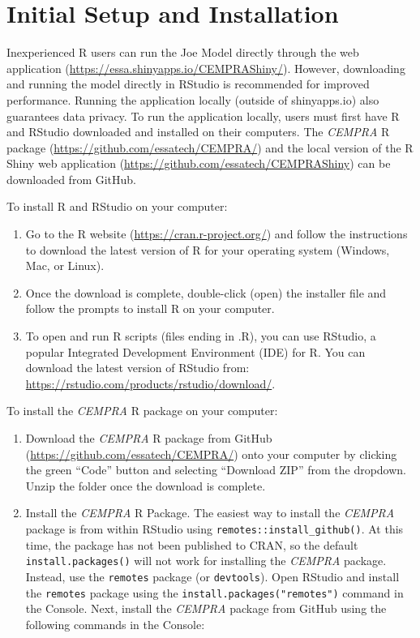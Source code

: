 \documentclass[
  letterpaper,
  DIV=11,
  numbers=noendperiod]{scrreprt}
\providecommand{\tightlist}{%
  \setlength{\itemsep}{0pt}\setlength{\parskip}{0pt}}\usepackage{longtable,booktabs,array}
\begin{document}
\hypertarget{initial-setup-and-installation-1}{%
\section{Initial Setup and
Installation}\label{initial-setup-and-installation-1}}

Inexperienced R users can run the Joe Model directly through the web
application (\url{https://essa.shinyapps.io/CEMPRAShiny/}). However,
downloading and running the model directly in RStudio is recommended for
improved performance. Running the application locally (outside of
shinyapps.io) also guarantees data privacy. To run the application
locally, users must first have R and RStudio downloaded and installed on
their computers. The \emph{CEMPRA} R package
(\url{https://github.com/essatech/CEMPRA/}) and the local version of the
R Shiny web application (\url{https://github.com/essatech/CEMPRAShiny})
can be downloaded from GitHub.

To install R and RStudio on your computer:

\begin{enumerate}
\def\labelenumi{\arabic{enumi}.}
\tightlist
\item
  Go to the R website (\url{https://cran.r-project.org/}) and follow the
  instructions to download the latest version of R for your operating
  system (Windows, Mac, or Linux).
\item
  Once the download is complete, double-click (open) the installer file
  and follow the prompts to install R on your computer.
\item
  To open and run R scripts (files ending in .R), you can use RStudio, a
  popular Integrated Development Environment (IDE) for R. You can
  download the latest version of RStudio from:
  \url{https://rstudio.com/products/rstudio/download/}.
\end{enumerate}

To install the \emph{CEMPRA} R package on your computer:

\begin{enumerate}
\def\labelenumi{\arabic{enumi}.}
\tightlist
\item
  Download the \emph{CEMPRA} R package from GitHub
  (\url{https://github.com/essatech/CEMPRA/}) onto your computer by
  clicking the green ``Code'' button and selecting ``Download ZIP'' from
  the dropdown. Unzip the folder once the download is complete.
\item
  Install the \emph{CEMPRA} R Package. The easiest way to install the
  \emph{CEMPRA} package is from within RStudio using
  \texttt{remotes::install\_github()}. At this time, the package has not
  been published to CRAN, so the default \texttt{install.packages()}
  will not work for installing the \emph{CEMPRA} package. Instead, use
  the \texttt{remotes} package (or \texttt{devtools}). Open RStudio and
  install the \texttt{remotes} package using the
  \texttt{install.packages("remotes")} command in the Console. Next,
  install the \emph{CEMPRA} package from GitHub using the following
  commands in the Console:
\end{enumerate}
\end{document}

